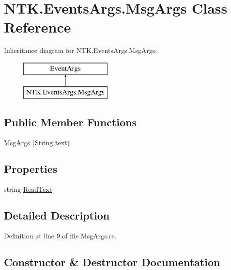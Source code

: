 \hypertarget{class_n_t_k_1_1_events_args_1_1_msg_args}{}\section{N\+T\+K.\+Events\+Args.\+Msg\+Args Class Reference}
\label{class_n_t_k_1_1_events_args_1_1_msg_args}
Inheritance diagram for N\+T\+K.\+Events\+Args.\+Msg\+Args\+:\begin{figure}[H]
\begin{center}
\leavevmode
\includegraphics[height=2.000000cm]{d8/dc8/class_n_t_k_1_1_events_args_1_1_msg_args}
\end{center}
\end{figure}
\subsection*{Public Member Functions}
\begin{DoxyCompactItemize}
\item 
\mbox{\hyperlink{class_n_t_k_1_1_events_args_1_1_msg_args_a2ec0160864dc6d121e8965dfe4abb0cc}{Msg\+Args}} (String text)
\end{DoxyCompactItemize}
\subsection*{Properties}
\begin{DoxyCompactItemize}
\item 
string \mbox{\hyperlink{class_n_t_k_1_1_events_args_1_1_msg_args_a9d2bfa091ea5be54c00b0ad9264661de}{Read\+Text}}
\end{DoxyCompactItemize}


\subsection{Detailed Description}


Definition at line 9 of file Msg\+Args.\+cs.



\subsection{Constructor \& Destructor Documentation}
\mbox{\label{class_n_t_k_1_1_events_args_1_1_msg_args_a2ec0160864dc6d121e8965dfe4abb0cc}} 
